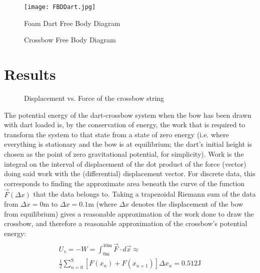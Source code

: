 \documentclass[reprint,amsmath,amssymb,aps,twoside]{revtex4-2}
\begin{document}
\begin{figure}
\begin{center}
\texttt{[image: FBDDart.jpg]}
\end{center}
\caption{\label{fig:2} Foam Dart Free Body Diagram}
\end{figure}

\begin{figure}
\begin{center}
\end{center}
\caption{\label{fig:3} Crossbow Free Body Diagram}
\end{figure}






\section{Results}
\begin{figure}
\begin{center}
\end{center}
\caption{\label{fig:4} Displacement vs. Force of the crossbow string}
\end{figure}
The potential energy of the dart-crossbow system when the bow has been drawn with dart loaded is, by the conservation of energy, the work that is required to transform the system to that state from a state of zero energy (i.e. where everything is stationary and the bow is at equilibrium; the dart’s initial height is chosen as the point of zero gravitational potential, for simplicity). Work is the integral on the interval of displacement of the dot product of the force (vector) doing said work with the (differential) displacement vector. For discrete data, this corresponds to finding the approximate area beneath the curve of the function $\vec{F}(\Delta x)$ that the data belongs to. Taking a trapezoidal Riemann sum of the data from $\Delta x=0\text{m}$ to $\Delta x=0.1\text{m}$ (where $\Delta x$ denotes the displacement of the bow from equilibrium) gives a reasonable approximation of the work done to draw the crossbow, and therefore a reasonable approximation of the crossbow’s potential energy:
\begin{gather*}
	\\U_s=-W=\int_{0\text{m}}^{10\text{m}} \vec{F} \cdot d\vec{x} \approx
\\ \frac{1}{2}\sum_{n=0}^{9} [F(x_n)+F(x_{n+1})]\Delta x_n = 0.512 \text{J}
\end{gather*}
\end{document}
